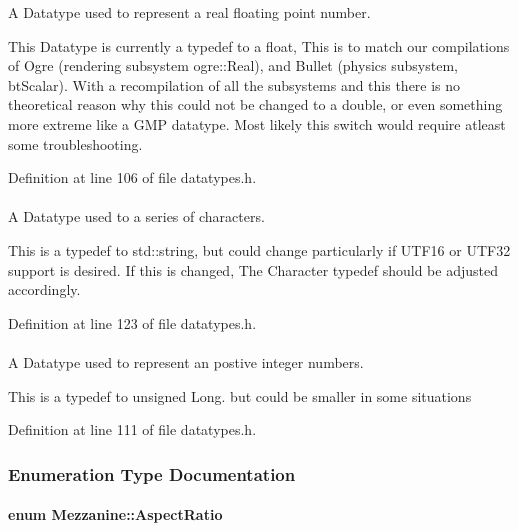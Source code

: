 A Datatype used to represent a real floating point number. 

This Datatype is currently a typedef to a float, This is to match our compilations of Ogre (rendering subsystem ogre::Real), and Bullet (physics subsystem, btScalar). With a recompilation of all the subsystems and this there is no theoretical reason why this could not be changed to a double, or even something more extreme like a GMP datatype. Most likely this switch would require atleast some troubleshooting. 

Definition at line 106 of file datatypes.h.

\hypertarget{namespaceMezzanine_acf9fcc130e6ebf08e3d8491aebcf1c86}{
\paragraph[{String}]{}\hfill}
\label{namespaceMezzanine_acf9fcc130e6ebf08e3d8491aebcf1c86}


A Datatype used to a series of characters. 

This is a typedef to std::string, but could change particularly if UTF16 or UTF32 support is desired. If this is changed, The Character typedef should be adjusted accordingly. 

Definition at line 123 of file datatypes.h.

\hypertarget{namespaceMezzanine_adcbb6ce6d1eb4379d109e51171e2e493}{
\paragraph[{Whole}]{}\hfill}
\label{namespaceMezzanine_adcbb6ce6d1eb4379d109e51171e2e493}


A Datatype used to represent an postive integer numbers. 

This is a typedef to unsigned Long. but could be smaller in some situations 

Definition at line 111 of file datatypes.h.



\subsubsection{Enumeration Type Documentation}
\hypertarget{namespaceMezzanine_a4f14cccd98d1bdc1bf934c1c028e3eaf}{
\paragraph[{AspectRatio}]{\setlength{\rightskip}{0pt plus 5cm}enum {\bf Mezzanine::AspectRatio}}\hfill}
\label{namespaceMezzanine_a4f14cccd98d1bdc1bf934c1c028e3eaf}


